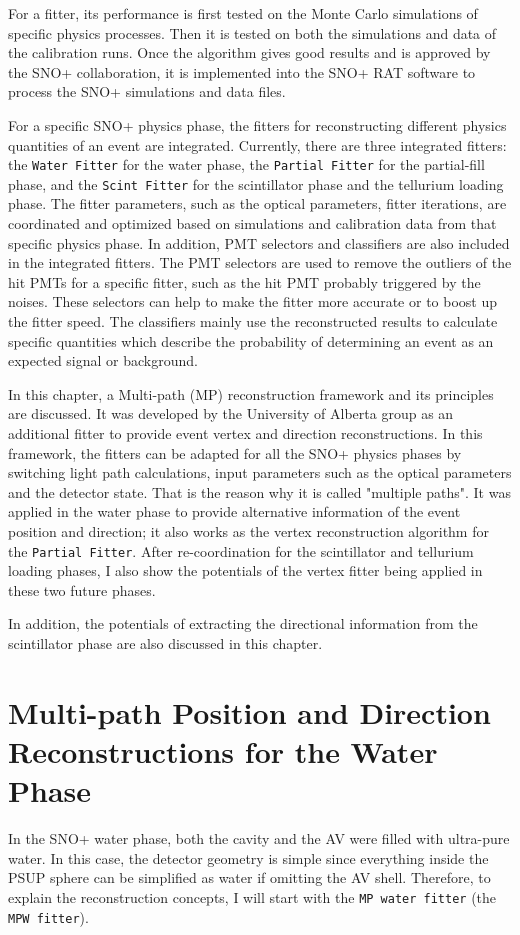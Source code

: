 For a fitter, its performance is first tested on the Monte Carlo simulations of specific physics processes. Then it is tested on both the simulations and data of the calibration runs. Once the algorithm gives good results and is approved by the SNO+ collaboration, it is implemented into the SNO+ RAT software to process the SNO+ simulations and data files.

For a specific SNO+ physics phase, the fitters for reconstructing different physics quantities of an event are integrated. Currently, there are three integrated fitters: the \texttt{Water Fitter} for the water phase, the \texttt{Partial Fitter} for the partial-fill phase, and the \texttt{Scint Fitter} for the scintillator phase and the tellurium loading phase. The fitter parameters, such as the optical parameters, fitter iterations, are coordinated and optimized based on simulations and calibration data from that specific physics phase. In addition, PMT selectors and classifiers are also included in the integrated fitters. The PMT selectors are used to remove the outliers of the hit PMTs for a specific fitter, such as the hit PMT probably triggered by the noises. These selectors can help to make the fitter more accurate or to boost up the fitter speed. The classifiers mainly use the reconstructed results to calculate specific quantities which describe the probability of determining an event as an expected signal or background.

In this chapter, a Multi-path (MP) reconstruction framework and its principles are discussed. It was developed by the University of Alberta group as an additional fitter to provide event vertex and direction reconstructions. In this framework, the fitters can be adapted for all the SNO+ physics phases by switching light path calculations, input parameters such as the optical parameters and the detector state. That is the reason why it is called "multiple paths".  It was applied in the water phase to provide alternative information of the event position and direction; it also works as the vertex reconstruction algorithm for the \texttt{Partial Fitter}. After re-coordination for the scintillator and tellurium loading phases, I also show the potentials of the vertex fitter being applied in these two future phases.

In addition, the potentials of extracting the directional information from the scintillator phase are also discussed in this chapter.

\section{Multi-path Position and Direction Reconstructions for the Water Phase}\label{sect:mpw}
In the SNO+ water phase, both the cavity and the AV were filled with ultra-pure water. In this case, the detector geometry is simple since everything inside the PSUP sphere can be simplified as water if omitting the AV shell. Therefore, to explain the reconstruction concepts, I will start with the \texttt{MP water fitter} (the \texttt{MPW fitter}).

